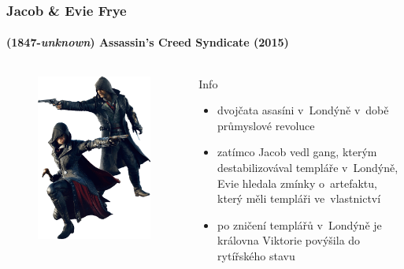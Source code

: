 \documentclass[hyperref={colorlinks, linkcolor=white, urlcolor=green!50!black}]{beamer}
\begin{document}
\begin{frame}\label{jacob,evie}
\frametitle{Jacob \& Evie Frye}
\framesubtitle{(1847-\textit{unknown}) \hfill Assassin's Creed Syndicate (2015)}
\begin{columns}[c]
	
	\begin{figure}[h]
		\centering
		\includegraphics[width=\textwidth]{char_twins}
	\end{figure}

	\begin{block}{Info}
		\begin{itemize}
			\item dvojčata asasíni v~Londýně v~době průmyslové revoluce
			\item zatímco Jacob vedl gang, kterým destabilizovával templáře v~Londýně, Evie hledala zmínky o~artefaktu, který měli templáři ve~vlastnictví
			\item po zničení templářů v~Londýně je královna Viktorie povýšila do rytířského stavu
		\end{itemize}
	\end{block}
	
\end{columns}
\end{frame}
\end{document}
